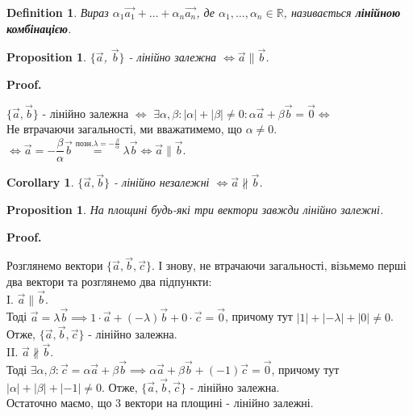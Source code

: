 \documentclass[a4paper, 10pt]{extarticle}
\makeatletter
\def\qed{$\blacksquare$}
\def\qed{$\blacksquare$}
\theoremstyle{theoremdd}
\theoremstyle{theoremdd}
\newtheorem{definition}[theorem]{Definition}
\theoremstyle{theoremdd}
\theoremstyle{theoremdd}
\theoremstyle{theoremdd}
\newtheorem{proposition}[theorem]{Proposition}
\theoremstyle{theoremdd}
\theoremstyle{theoremdd}
\theoremstyle{theoremdd}
\newtheorem{corollary}[theorem]{Corollary}
\renewenvironment{proof}[1][Proof.\\]{\par
\pushQED{\hfill \qed}%
\normalfont \topsep6\p@\@plus6\p@\relax
\trivlist
\item\relax
{\bfseries
#1\@addpunct{.}}\hspace\labelsep\ignorespaces
}{%
\popQED\endtrivlist\@endpefalse
}
\makeatother
\begin{document}
\begin{definition}
Вираз $\alpha_1 \vec{a_1} + \dots + \alpha_n \vec{a_n}$, де $\alpha_1, \dots, \alpha_n \in \mathbb{R}$, називається \textbf{лінійною комбінацією}.
\end{definition}

\begin{proposition}
$\{\vec{a}$, $\vec{b}\}$ - лінійно залежна $\iff \vec{a} \parallel \vec{b}$.
\end{proposition}

\begin{proof}
	$\{\vec{a},\vec{b}\}$ - лінійно залежна $\iff$ $\exists \alpha, \beta: |\alpha| + |\beta| \neq 0: \alpha \vec{a} + \beta \vec{b} = \vec{0} \boxed{\iff}$\\
	Не втрачаючи загальності, ми вважатимемо, що $\alpha \neq 0$.\\
	$\boxed{\iff} \vec{a} = -\dfrac{\beta}{\alpha} \vec{b} \overset{\text{позн.} \lambda = -\frac{\beta}{\alpha}}{=} \lambda \vec{b} \iff \vec{a} \parallel \vec{b}$.
\end{proof}

\begin{corollary}
$\{\vec{a}, \vec{b}\}$ - лінійно незалежні $\iff \vec{a} \not\parallel \vec{b}$.
\end{corollary}

\begin{proposition}
	На площині будь-які три вектори завжди лінійно залежні.
\end{proposition}

\begin{proof}
	Розглянемо вектори $\{\vec{a},\vec{b},\vec{c}\}$. І знову, не втрачаючи загальності, візьмемо перші два вектори та розглянемо два підпункти:\\
	I. $\vec{a} \parallel \vec{b}$.\\
	Тоді $\vec{a} = \lambda \vec{b} \implies 1 \cdot \vec{a} + (-\lambda) \vec{b} + 0 \cdot \vec{c} = \vec{0}$, причому тут $|1|+|-\lambda|+|0| \neq 0$. Отже, $\{\vec{a}, \vec{b}, \vec{c}\}$ - лінійно залежна.
	\bigskip \\
	II. $\vec{a} \not\parallel \vec{b}$.\\
	Тоді $\exists \alpha, \beta: \vec{c} = \alpha \vec{a} + \beta \vec{b} \implies \alpha \vec{a} + \beta \vec{b} + (-1) \vec{c} = \vec{0}$, причому тут $|\alpha| + |\beta| + |-1| \neq 0$. Отже, $\{\vec{a}, \vec{b}, \vec{c}\}$ - лінійно залежна.\\
	Остаточно маємо, що 3 вектори на площині - лінійно залежні.
\end{proof}
\end{document}
